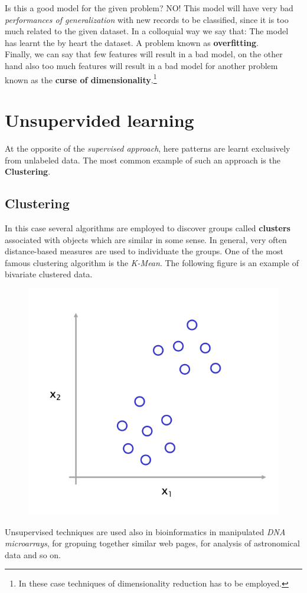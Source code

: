 \noindent
Is this a good model for the given problem? NO! This model will have very bad \textit{performances of generalization} with new records to be classified, since it is too much related to the given dataset. In a colloquial way we say that: \textsf{The model has learnt the by heart the dataset}. A problem known as \textbf{overfitting}. \\
Finally, we can say that few features will result in a bad model, on the other hand also too much features will result in a bad model for another problem known as the \textbf{curse of dimensionality}.\footnote{
    In these case techniques of dimensionality reduction has to be employed.
}

\section{Unsupervided learning}
At the opposite of the \textit{supervised approach}, here patterns are learnt exclusively from unlabeled data. The most common example of such an approach is the \textbf{Clustering}.

\subsection{Clustering}
In this case several algorithms are employed to discover groups called \textbf{clusters} associated with objects which are similar in some sense. In general, very often distance-based measures are used to individuate the groups. One of the most famous clustering algorithm is the \textit{K-Mean}. The following figure is an example of bivariate clustered data. 

\begin{figure}[h]
    \centering
    \includegraphics[scale=0.5]{img/clustering.png}
\end{figure}

Unsupervised techniques are used also in bioinformatics in manipulated \textit{DNA microarrays}, for gropuing together similar web pages, for analysis of astronomical data and so on.